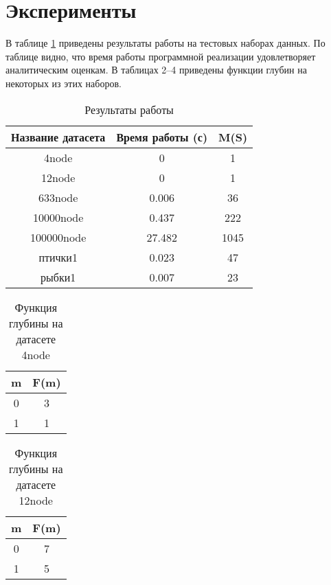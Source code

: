 \documentclass[twoside]{article}
\begin{document}
\section{Эксперименты}
В таблице \ref{my-label1} приведены результаты работы на тестовых наборах данных. По таблице видно, что время работы программной реализации удовлетворяет аналитическим оценкам. В таблицах 2--4 приведены функции глубин на некоторых из этих наборов.

\begin{table}[]
	\centering
	\caption{Результаты работы}
	\label{my-label1}
	\begin{tabular}{|c|c|c|}
		\hline
		\textbf{Название датасета} & \textbf{Время работы (с)} & \textbf{M(S)} \\ \hline
		4node                      & 0                     & 1             \\ 
		12node                     & 0                     & 1             \\ 
		633node                    & 0.006                 & 36            \\ 
		10000node                  & 0.437                 & 222           \\ 
		100000node                 & 27.482                & 1045          \\ \hline
		птички1                    & 0.023                 & 47            \\ 
		рыбки1                     & 0.007                 & 23            \\ \hline
	\end{tabular}
\end{table}

\begin{table}[]
	\centering
	\caption{Функция глубины на датасете 4node}
	\label{my-label}
	\begin{tabular}{|c|c|}
		\hline
		\textbf{m} & \textbf{F(m)} \\ \hline
		0          & 3             \\ 
		1          & 1             \\ \hline
	\end{tabular}
\end{table}

\begin{table}[]
	\centering
	\caption{Функция глубины на датасете 12node}
	\label{my-label}
	\begin{tabular}{|c|c|}
		\hline
		\textbf{m} & \textbf{F(m)} \\ \hline
		0          & 7             \\ 
		1          & 5             \\ \hline
	\end{tabular}
\end{table}
\end{document}
